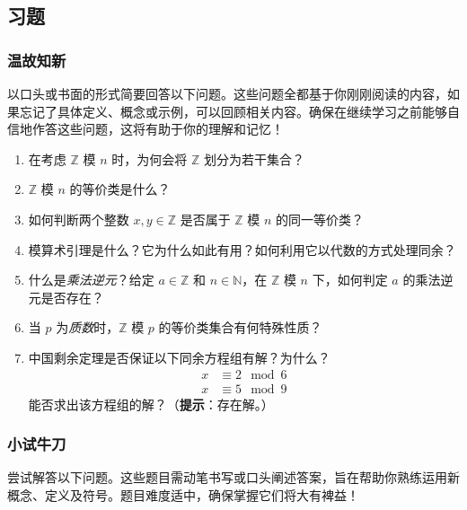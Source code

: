 
\subsection{习题}

\subsubsection*{温故知新}

以口头或书面的形式简要回答以下问题。这些问题全都基于你刚刚阅读的内容，如果忘记了具体定义、概念或示例，可以回顾相关内容。确保在继续学习之前能够自信地作答这些问题，这将有助于你的理解和记忆！

\begin{enumerate}[label=(\arabic*)]
    \item 在考虑 $\mathbb{Z}$ 模 $n$ 时，为何会将 $\mathbb{Z}$ 划分为若干集合？
    \item $\mathbb{Z}$ 模 $n$ 的等价类是什么？
    \item 如何判断两个整数 $x, y \in \mathbb{Z}$ 是否属于 $\mathbb{Z}$ 模 $n$ 的同一等价类？
    \item 模算术引理是什么？它为什么如此有用？如何利用它以代数的方式处理同余？
    \item 什么是\emph{乘法逆元}？给定 $a \in \mathbb{Z}$ 和 $n \in \mathbb{N}$，在 $\mathbb{Z}$ 模 $n$ 下，如何判定 $a$ 的乘法逆元是否存在？
    \item 当 $p$ 为\emph{质数}时，$\mathbb{Z}$ 模 $p$ 的等价类集合有何特殊性质？
    \item 中国剩余定理是否保证以下同余方程组有解？为什么？
    \begin{align*}
        x &\equiv 2 \mod 6 \\
        x &\equiv 5 \mod 9
    \end{align*} 
    能否求出该方程组的解？（\textbf{提示}：存在解。）
\end{enumerate}

\subsubsection*{小试牛刀}

尝试解答以下问题。这些题目需动笔书写或口头阐述答案，旨在帮助你熟练运用新概念、定义及符号。题目难度适中，确保掌握它们将大有裨益！


